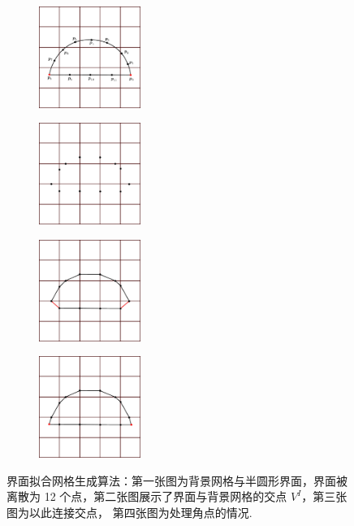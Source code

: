 \begin{figure}[h]
\centering
\begin{subfigure}{.24\textwidth}
    \centering
    \includegraphics[width=1.3in]{./figures/movingmaxwell/interface_half_cricle.pdf}
    \label{fig:UnfitMesh1} %
\end{subfigure}
\begin{subfigure}{.24\textwidth}
    \centering
    \includegraphics[width=1.3in]{./figures/movingmaxwell/cut_point.pdf}
    \label{fig:UnfitMesh2} %
\end{subfigure}
\begin{subfigure}{.24\textwidth}
    \centering
    \includegraphics[width=1.3in]{./figures/movingmaxwell/cut_mesh_0.pdf}
    \label{fig:NonConfMesh1} %
\end{subfigure}
\begin{subfigure}{.24\textwidth}
    \centering
    \includegraphics[width=1.3in]{./figures/movingmaxwell/cut_mesh_1.pdf}
    \label{fig:NonConfMesh2} %
\end{subfigure}
\caption{界面拟合网格生成算法：第一张图为背景网格与半圆形界面，界面被离散为
12 个点，第二张图展示了界面与背景网格的交点 $V^I$，第三张图为以此连接交点，
第四张图为处理角点的情况.}
\label{fig:UnfitMesh}
\end{figure}

